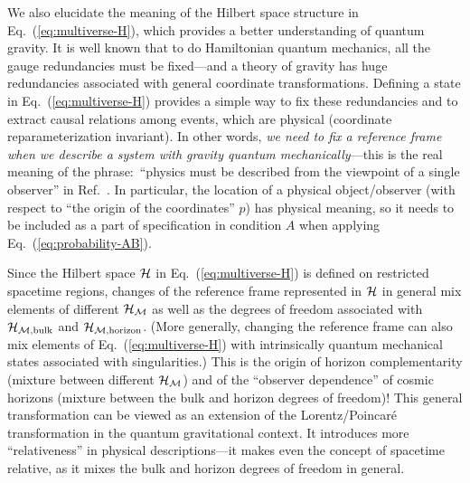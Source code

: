 \documentclass[12pt]{article}
\begin{document}
We also elucidate the meaning of the Hilbert space structure in 
Eq.~(\ref{eq:multiverse-H}), which provides a better understanding of 
quantum gravity.  It is well known that to do Hamiltonian quantum mechanics, 
all the gauge redundancies must be fixed---and a theory of gravity has 
huge redundancies associated with general coordinate transformations. 
Defining a state in Eq.~(\ref{eq:multiverse-H}) provides a simple way 
to fix these redundancies and to extract causal relations among events, 
which are physical (coordinate reparameterization invariant).  In other 
words, {\it we need to fix a reference frame when we describe a system 
with gravity quantum mechanically}---this is the real meaning of the 
phrase:\ ``physics must be described from the viewpoint of a single 
observer'' in Ref.~\cite{Nomura:2011dt}.  In particular, the location 
of a physical object/observer (with respect to ``the origin of 
the coordinates'' $p$) has physical meaning, so it needs to be 
included as a part of specification in condition $A$ when applying 
Eq.~(\ref{eq:probability-AB}).

Since the Hilbert space ${\cal H}$ in Eq.~(\ref{eq:multiverse-H}) 
is defined on restricted spacetime regions, changes of the reference 
frame represented in ${\cal H}$ in general mix elements of different 
${\cal H}_{\cal M}$ as well as the degrees of freedom associated with 
${\cal H}_{{\cal M}, {\rm bulk}}$ and ${\cal H}_{{\cal M}, {\rm horizon}}$. 
(More generally, changing the reference frame can also mix elements 
of Eq.~(\ref{eq:multiverse-H}) with intrinsically quantum mechanical 
states associated with singularities.)  This is the origin of horizon 
complementarity (mixture between different ${\cal H}_{\cal M}$) and 
of the ``observer dependence'' of cosmic horizons (mixture between 
the bulk and horizon degrees of freedom)!  This general transformation 
can be viewed as an extension of the Lorentz/Poincar\'{e} transformation 
in the quantum gravitational context.  It introduces more ``relativeness'' 
in physical descriptions---it makes even the concept of spacetime 
relative, as it mixes the bulk and horizon degrees of freedom in general.
\end{document}
